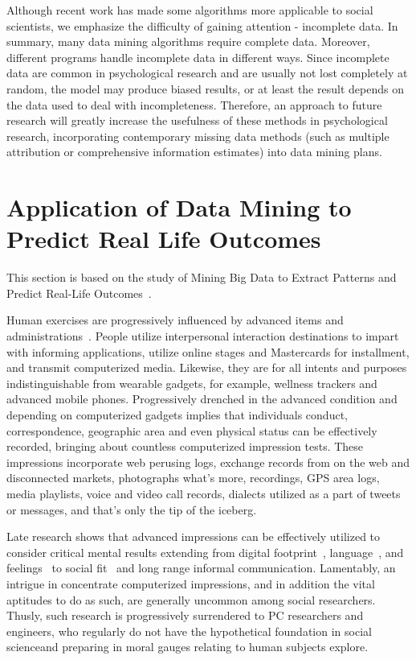Although recent work has made some algorithms more applicable to 
social scientists, we emphasize the difficulty of gaining 
attention - incomplete data. In summary, many data mining 
algorithms require complete data. Moreover, different programs 
handle incomplete data in different ways. Since incomplete data are
 common in psychological research and are usually not lost 
completely at random, the model may produce biased results, or at 
least the result depends on the data used to deal with 
incompleteness. Therefore, an approach to future research will 
greatly increase the usefulness of these methods in psychological 
research, incorporating contemporary missing data methods (such as
 multiple attribution or comprehensive information estimates) into
 data mining plans.

\section{Application of Data Mining to Predict Real Life Outcomes}

This section is based on the study of Mining Big Data to Extract 
Patterns and Predict Real-Life Outcomes~\cite{editor12}.

Human exercises are progressively influenced by advanced items and 
administrations~\cite{editor13}. 
People utilize interpersonal interaction destinations to impart 
with informing applications, utilize online stages and Mastercards 
for installment, and transmit computerized media. Likewise, they 
are for all intents and purposes indistinguishable from wearable 
gadgets, for example, wellness 
trackers and advanced mobile phones. Progressively drenched in the
 advanced 
condition and depending on computerized gadgets implies that 
individuals
conduct, correspondence, geographic area and even physical 
status can be effectively recorded, bringing about countless 
computerized impression tests. These impressions incorporate web 
perusing 
logs, exchange records from on the web and disconnected markets, 
photographs 
what's more, recordings, GPS area logs, media playlists, voice and
 video 
call records, dialects utilized as a part of tweets or messages, 
and that's only the tip of the iceberg.

Late research shows that advanced impressions can be effectively 
utilized to consider critical mental results 
extending from digital footprint~\cite{editor14}, 
language~\cite{editor15}, and feelings~\cite{editor16}  
to social fit~\cite{editor17} and long range informal communication. 
Lamentably, an intrigue in concentrate computerized impressions, 
and in addition the vital aptitudes 
to do as such, are generally uncommon among social researchers. Thusly, 
such research is progressively surrendered to PC researchers and 
engineers, who regularly do not have the hypothetical foundation in
 social scienceand preparing in moral gauges relating to human 
subjects explore.

